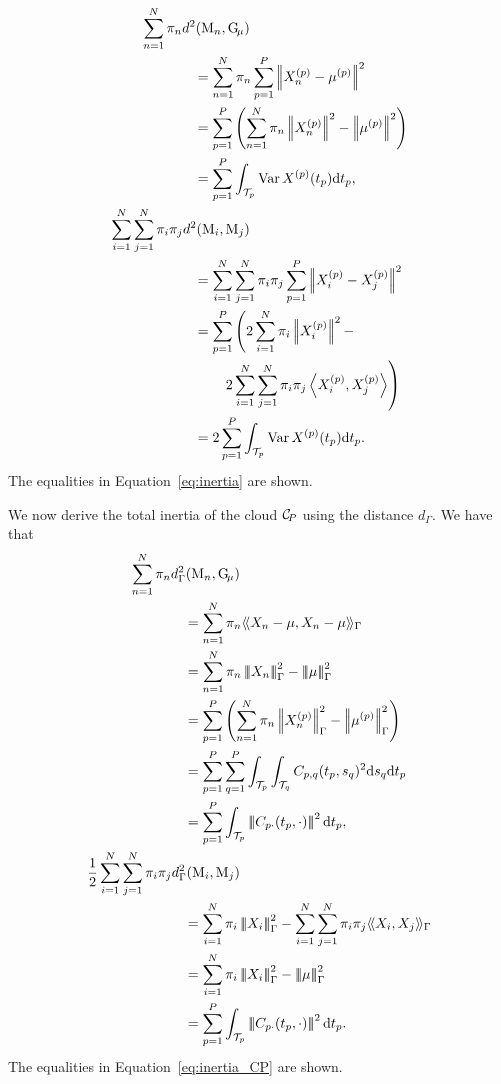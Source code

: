 \begin{align*}
    \sum_{n = 1}^N \pi_n d^2(\pobs{M}_n, \Gmu) & \\
    &\mkern-72mu = \sum_{n = 1}^N \pi_n \sum_{p = 1}^P\normLp{\Xnp - \mu^{(p)}}^2\\
    &\mkern-72mu = \sum_{p = 1}^P\left(\sum_{n = 1}^N \pi_n \normLp{\Xnp}^2 - \normLp{\mup{p}}^2\right) \\
    &\mkern-72mu = \sum_{p = 1}^P \int_{\TT{p}}\Var{\Xp{p}(t_p)} \dd t_p, \\
\sum_{i = 1}^N \sum_{j = 1}^N \pi_i \pi_j d^2(\pobs{M}_i, \pobs{M}_j) \\
    &\mkern-72mu = \sum_{i = 1}^N \sum_{j = 1}^N \pi_i \pi_j \sum_{p = 1}^P \normLp{\Xp{p}_i - \Xp{p}_j}^2\\
    &\mkern-72mu = \sum_{p = 1}^P \left(2\sum_{i = 1}^N \pi_i\normLp{\Xp{p}_i}^2 - \right. \\
    &\mkern-36mu \left.2\sum_{i = 1}^N \sum_{j = 1}^N \pi_i\pi_j\inLp{\Xp{p}_i}{\Xp{p}_j}\right) \\
    &\mkern-72mu = 2\sum_{p = 1}^P \int_{\TT{p}}\Var{\Xp{p}(t_p)} \dd t_p.
\end{align*}
The equalities in Equation~\eqref{eq:inertia} are shown.


We now derive the total inertia of the cloud $\mathcal{C}_{\!P}$ using the distance $d_\Gamma$. We have that
\begin{align*}
   \sum_{n = 1}^N \pi_n d_\Gamma^2(\pobs{M}_n, \Gmu) & \\
   &\mkern-72mu = \sum_{n = 1}^N \pi_n \inHG{X_n - \mu}{X_n - \mu} \\
   &\mkern-72mu = \sum_{n = 1}^N \pi_n \normHG{X_n}^2 - \normHG{\mu}^2 \\
   &\mkern-72mu = \sum_{p = 1}^P \left(\sum_{n = 1}^N \pi_n \normLp{\Xnp}_{\Gamma}^2 - \normLp{\mup{p}}_{\Gamma}^2\right) \\
   &\mkern-72mu = \sum_{p = 1}^P \sum_{q = 1}^P \int_{\TT{p}} \int_{\TT{q}} C_{p,q}(t_p, s_q)^2 \dd s_q \dd t_p \\
   &\mkern-72mu = \sum_{p = 1}^P \int_{\TT{p}} \normH{C_{p \cdot}(t_p, \cdot)}^2 \dd t_p, \\
   \frac{1}{2}\sum_{i = 1}^N \sum_{j = 1}^N \pi_i \pi_j d_\Gamma^2(\pobs{M}_i, \pobs{M}_j) & \\
   &\mkern-72mu = \sum_{i = 1}^N \pi_i \normHG{X_i}^2 - \sum_{i = 1}^N \sum_{j = 1}^N \pi_i\pi_j \inHG{X_i}{X_j} \\
   &\mkern-72mu = \sum_{i = 1}^N \pi_i \normHG{X_i}^2 - \normHG{\mu}^2 \\
   &\mkern-72mu = \sum_{p = 1}^P \int_{\TT{p}} \normH{C_{p \cdot}(t_p, \cdot)}^2 \dd t_p. 
\end{align*}
The equalities in Equation~\eqref{eq:inertia_CP} are shown.

